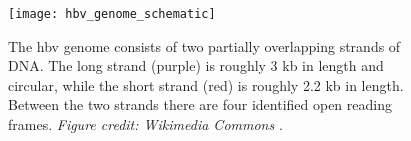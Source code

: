\begin{figure}[ht]
  \centering
  \medskip
  \texttt{[image: hbv\_genome\_schematic]}
  \caption[Schematic of the HBV genome]{The \gls{hbv} genome consists of two partially overlapping strands of DNA. The long strand (purple) is roughly 3 kb in length and circular, while the short strand (red) is roughly 2.2 kb in length. Between the two strands there are four identified open reading frames. \textit{Figure credit: Wikimedia Commons} \cite{HBVwiki}.}
  \label{fig:hbvGenome}
\end{figure}

\cleardoublepage

